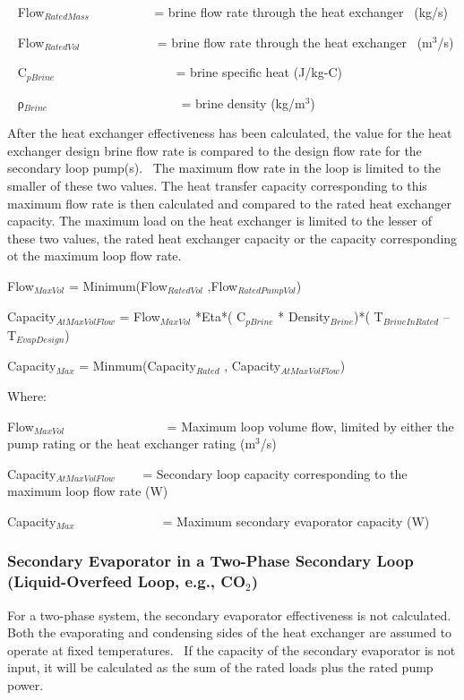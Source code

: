 ~ Flow\(_{RatedMass}\) ~~~~~~~~~ = brine flow rate through the heat exchanger~ (kg/s)

~ Flow\(_{RatedVol}\)~~ ~~~~~~~~~ = brine flow rate through the heat exchanger~ (m\(^{3}\)/s)

~ C\(_{pBrine}\)~~~~~~~~~~ ~~~~~~~~ = brine specific heat (J/kg-C)

~ ρ\(_{Brine}\)~ ~~~~~~~~~~~~~~~~~~~ = brine density (kg/m\(^{3}\))

After the heat exchanger effectiveness has been calculated, the value for the heat exchanger design brine flow rate is compared to the design flow rate for the secondary loop pump(s).~ The maximum flow rate in the loop is limited to the smaller of these two values. The heat transfer capacity corresponding to this maximum flow rate is then calculated and compared to the rated heat exchanger capacity. The maximum load on the heat exchanger is limited to the lesser of these two values, the rated heat exchanger capacity or the capacity corresponding ot the maximum loop flow rate.

Flow\(_{MaxVol}\) = Minimum(Flow\(_{RatedVol}\) ,Flow\(_{RatedPumpVol}\))

Capacity\(_{AtMaxVolFlow}\) = Flow\(_{MaxVol}\) *Eta*( C\(_{pBrine}\) * Density\(_{Brine}\))*( T\(_{BrineInRated}\) -- T\(_{EvapDesign}\))

Capacity\(_{Max}\) = Minmum(Capacity\(_{Rated}\) , Capacity\(_{AtMaxVolFlow}\))

Where:

Flow\(_{MaxVol}\)~ ~~~~~~~~~~~~~~ = Maximum loop volume flow, limited by either the pump rating or the heat exchanger rating (m\(^{3}\)/s)

Capacity\(_{AtMaxVolFlow}\) ~~~ = Secondary loop capacity corresponding to the maximum loop flow rate (W)

Capacity\(_{Max}\) ~~~~~~~~~~~ ~ = Maximum secondary evaporator capacity (W)

\subsubsection{Secondary Evaporator in a Two-Phase Secondary Loop~ (Liquid-Overfeed Loop, e.g., CO\(_{2}\))}\label{secondary-evaporator-in-a-two-phase-secondary-loop-liquid-overfeed-loop-e.g.-coux5f2}

For a two-phase system, the secondary evaporator effectiveness is not calculated. Both the evaporating and condensing sides of the heat exchanger are assumed to operate at fixed temperatures.~ If the capacity of the secondary evaporator is not input, it will be calculated as the sum of the rated loads plus the rated pump power.

